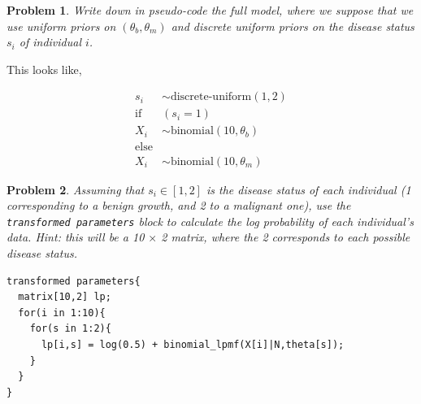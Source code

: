 \documentclass{article}
\newtheorem{problem}{Problem}[section]
\begin{document}
\begin{problem}
	Write down in pseudo-code the full model, where we suppose that we use uniform priors on $(\theta_b,\theta_m)$ and discrete uniform priors on the disease status $s_i$ of individual $i$.
\end{problem}

This looks like,

\begin{align}
s_i &\sim \text{discrete-uniform}(1,2)\\
\text{if} \;\;\;&(s_i = 1)\\
X_i &\sim \text{binomial}(10,\theta_b)\\
\text{else} &\\
X_i &\sim \text{binomial}(10,\theta_m)
\end{align}

\begin{problem}
	Assuming that $s_i\in[1,2]$ is the disease status of each individual (1 corresponding to a benign growth, and 2 to a malignant one), use the \texttt{transformed parameters} block to calculate the log probability of each individual's data. Hint: this will be a 10 $\times$ 2 matrix, where the 2 corresponds to each possible disease status.
\end{problem}

\begin{verbatim}
transformed parameters{
  matrix[10,2] lp;
  for(i in 1:10){
    for(s in 1:2){
      lp[i,s] = log(0.5) + binomial_lpmf(X[i]|N,theta[s]);
    }
  }
}
\end{verbatim}
\end{document}
